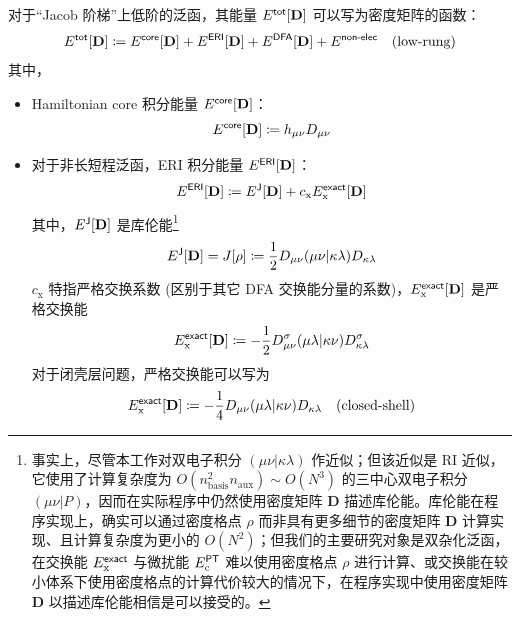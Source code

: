 对于“Jacob 阶梯”上低阶的泛函，其能量 $E^{\textsf{tot}}[\mathbf{D}]$ 可以写为密度矩阵的函数：
\begin{equation}
    E^{\textsf{tot}}[\mathbf{D}] \coloneq E^{\textsf{core}} [\mathbf{D}] + E^{\textsf{ERI}} [\mathbf{D}] + E^{\textsf{DFA}} [\mathbf{D}] + E^{\textsf{non-elec}} \quad \text{(low-rung)}
\end{equation}
其中，
\begin{itemize}[nosep]
\item Hamiltonian core 积分能量 $E^{\textsf{core}} [\mathbf{D}]$：
\begin{equation}
    E^{\textsf{core}} [\mathbf{D}] \coloneq h_{\mu \nu} D_{\mu \nu}
\end{equation}
\item 对于非长短程泛函，ERI 积分能量 $E^{\textsf{ERI}} [\mathbf{D}]$：
\begin{equation}
    \label{eq.3.def.eri}
    E^{\textsf{ERI}} [\mathbf{D}] \coloneq E^{\textsf{J}} [\mathbf{D}] + c_\mathrm{x} E_\mathrm{x}^{\textsf{exact}} [\mathbf{D}]
\end{equation}
其中，$E^{\textsf{J}} [\mathbf{D}]$ 是库伦能\footnote{事实上，尽管本工作对双电子积分 $(\mu \nu | \kappa \lambda)$ 作近似；但该近似是 RI 近似，它使用了计算复杂度为 $O(n_\mathrm{basis}^2 n_\mathrm{aux}) \sim O(N^3)$ 的三中心双电子积分 $(\mu \nu | P)$，因而在实际程序中仍然使用密度矩阵 $\mathbf{D}$ 描述库伦能。库伦能在程序实现上，确实可以通过密度格点 $\rho$ 而非具有更多细节的密度矩阵 $\mathbf{D}$ 计算实现、且计算复杂度为更小的 $O(N^2)$\cite{Toivanen-Sundholm.PCCP.2015}；但我们的主要研究对象是双杂化泛函，在交换能 $E_\mathrm{x}^{\textsf{exact}}$ 与微扰能 $E_\mathrm{c}^{\textsf{PT}}$ 难以使用密度格点 $\rho$ 进行计算、或交换能在较小体系下使用密度格点的计算代价较大\cite{IZSAK-NEESE.JCP.2011}的情况下，在程序实现中使用密度矩阵 $\mathbf{D}$ 以描述库伦能相信是可以接受的。}
\begin{equation}
    E^{\textsf{J}} [\mathbf{D}] = J[\rho] \coloneq \frac{1}{2} D_{\mu \nu} (\mu \nu | \kappa \lambda) D_{\kappa \lambda}
\end{equation}
$c_\mathrm{x}$ 特指严格交换系数 (区别于其它 DFA 交换能分量的系数)，$E_\mathrm{x}^{\textsf{exact}} [\mathbf{D}]$ 是严格交换能
\begin{equation}
    E_\mathrm{x}^{\textsf{exact}} [\mathbf{D}] \coloneq - \frac{1}{2} D_{\mu \nu}^\sigma (\mu \lambda | \kappa \nu) D_{\kappa \lambda}^\sigma
\end{equation}
对于闭壳层问题，严格交换能可以写为
\begin{equation}
    E_\mathrm{x}^\textmt{exact} [\mathbf{D}] \coloneq - \frac{1}{4} D_{\mu \nu} (\mu \lambda | \kappa \nu) D_{\kappa \lambda} \quad \text{(closed-shell)}

\end{equation}
\end{itemize}
